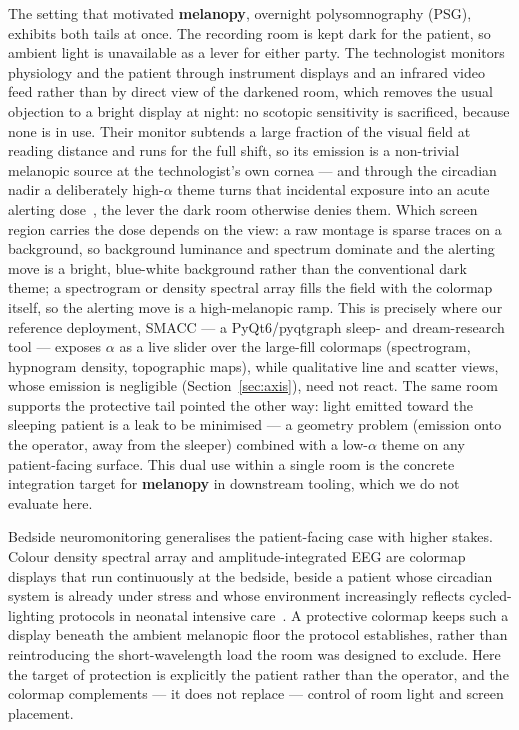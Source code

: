 \documentclass[10pt,a4paper,twocolumn]{article}
\begin{document}
The setting that motivated \textbf{melanopy}, overnight polysomnography (PSG), exhibits both tails at once.
The recording room is kept dark for the patient, so ambient light is unavailable as a lever for either party.
The technologist monitors physiology and the patient through instrument displays and an infrared video feed rather than by direct view of the darkened room, which removes the usual objection to a bright display at night: no scotopic sensitivity is sacrificed, because none is in use.
Their monitor subtends a large fraction of the visual field at reading distance and runs for the full shift, so its emission is a non-trivial melanopic source at the technologist's own cornea --- and through the circadian nadir a deliberately high-$\alpha$ theme turns that incidental exposure into an acute alerting dose~\cite{lockley2006shortwave}, the lever the dark room otherwise denies them.
Which screen region carries the dose depends on the view: a raw montage is sparse traces on a background, so background luminance and spectrum dominate and the alerting move is a bright, blue-white background rather than the conventional dark theme; a spectrogram or density spectral array fills the field with the colormap itself, so the alerting move is a high-melanopic ramp.
This is precisely where our reference deployment, SMACC --- a PyQt6/pyqtgraph sleep- and dream-research tool --- exposes $\alpha$ as a live slider over the large-fill colormaps (spectrogram, hypnogram density, topographic maps), while qualitative line and scatter views, whose emission is negligible (Section~\ref{sec:axis}), need not react.
The same room supports the protective tail pointed the other way: light emitted toward the sleeping patient is a leak to be minimised --- a geometry problem (emission onto the operator, away from the sleeper) combined with a low-$\alpha$ theme on any patient-facing surface.
This dual use within a single room is the concrete integration target for \textbf{melanopy} in downstream tooling, which we do not evaluate here.

Bedside neuromonitoring generalises the patient-facing case with higher stakes.
Colour density spectral array and amplitude-integrated EEG are colormap displays that run continuously at the bedside, beside a patient whose circadian system is already under stress and whose environment increasingly reflects cycled-lighting protocols in neonatal intensive care~\cite{morag2024cycled}.
A protective colormap keeps such a display beneath the ambient melanopic floor the protocol establishes, rather than reintroducing the short-wavelength load the room was designed to exclude.
Here the target of protection is explicitly the patient rather than the operator, and the colormap complements --- it does not replace --- control of room light and screen placement.
\end{document}
